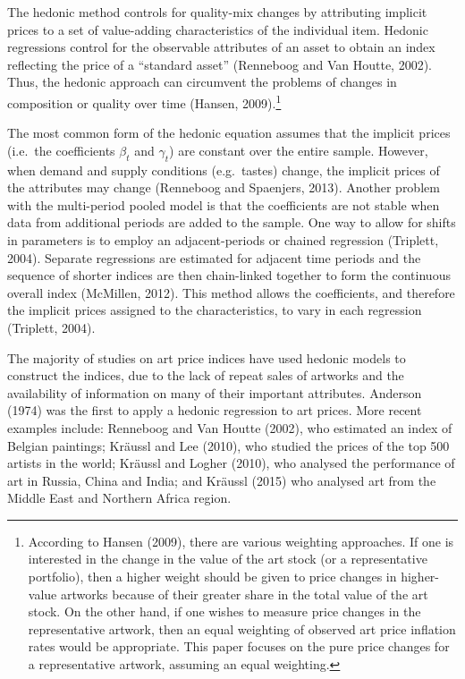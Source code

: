 \documentclass[12pt,]{article}
\let\rmarkdownfootnote\footnote%
\def\footnote{\protect\rmarkdownfootnote}
\begin{document}
The hedonic method controls for quality-mix changes by attributing
implicit prices to a set of value-adding characteristics of the
individual item. Hedonic regressions control for the observable
attributes of an asset to obtain an index reflecting the price of a
``standard asset'' (Renneboog and Van Houtte, 2002). Thus, the hedonic
approach can circumvent the problems of changes in composition or
quality over time (Hansen, 2009).\footnote{According to Hansen (2009),
  there are various weighting approaches. If one is interested in the
  change in the value of the art stock (or a representative portfolio),
  then a higher weight should be given to price changes in higher-value
  artworks because of their greater share in the total value of the art
  stock. On the other hand, if one wishes to measure price changes in
  the representative artwork, then an equal weighting of observed art
  price inflation rates would be appropriate. This paper focuses on the
  pure price changes for a representative artwork, assuming an equal
  weighting.}

The most common form of the hedonic equation assumes that the implicit
prices (i.e.~the coefficients \(\beta_t\) and \(\gamma_t\)) are constant
over the entire sample. However, when demand and supply conditions
(e.g.~tastes) change, the implicit prices of the attributes may change
(Renneboog and Spaenjers, 2013). Another problem with the multi-period
pooled model is that the coefficients are not stable when data from
additional periods are added to the sample. One way to allow for shifts
in parameters is to employ an adjacent-periods or chained regression
(Triplett, 2004). Separate regressions are estimated for adjacent time
periods and the sequence of shorter indices are then chain-linked
together to form the continuous overall index (McMillen, 2012). This
method allows the coefficients, and therefore the implicit prices
assigned to the characteristics, to vary in each regression (Triplett,
2004).

The majority of studies on art price indices have used hedonic models to
construct the indices, due to the lack of repeat sales of artworks and
the availability of information on many of their important attributes.
Anderson (1974) was the first to apply a hedonic regression to art
prices. More recent examples include: Renneboog and Van Houtte (2002),
who estimated an index of Belgian paintings; Kräussl and Lee (2010), who
studied the prices of the top 500 artists in the world; Kräussl and
Logher (2010), who analysed the performance of art in Russia, China and
India; and Kräussl (2015) who analysed art from the Middle East and
Northern Africa region.
\end{document}
